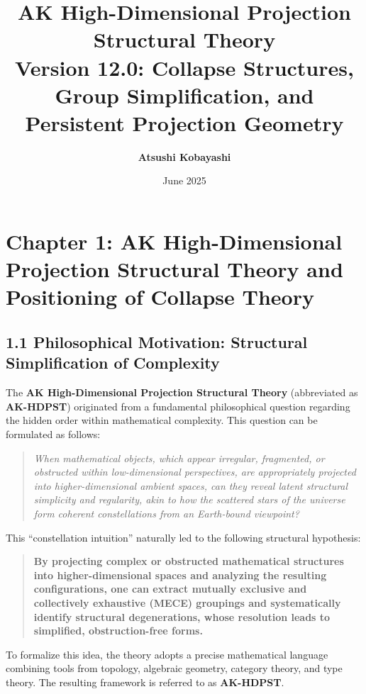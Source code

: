 \documentclass[11pt]{article}
\title{AK High-Dimensional Projection Structural Theory\\
\Large Version 12.0: Collapse Structures, Group Simplification, and Persistent Projection Geometry}
\author{\textbf{Atsushi Kobayashi} \quad {\small (with ChatGPT Research Partner)}}
\date{June 2025}
\begin{document}
\maketitle
\tableofcontents
\newpage


\section{Chapter 1: AK High-Dimensional Projection Structural Theory and Positioning of Collapse Theory}

\subsection*{1.1 Philosophical Motivation: Structural Simplification of Complexity}

The \textbf{AK High-Dimensional Projection Structural Theory} (abbreviated as \textbf{AK-HDPST}) originated from a fundamental philosophical question regarding the hidden order within mathematical complexity. This question can be formulated as follows:

\begin{quote}
\textit{
When mathematical objects, which appear irregular, fragmented, or obstructed within low-dimensional perspectives,  
are appropriately projected into higher-dimensional ambient spaces,  
can they reveal latent structural simplicity and regularity, akin to how the scattered stars of the universe form coherent constellations from an Earth-bound viewpoint?  
}
\end{quote}

This ``constellation intuition'' naturally led to the following structural hypothesis:

\begin{quote}
\textbf{By projecting complex or obstructed mathematical structures into higher-dimensional spaces and analyzing the resulting configurations,  
one can extract mutually exclusive and collectively exhaustive (MECE) groupings and systematically identify structural degenerations,  
whose resolution leads to simplified, obstruction-free forms.}
\end{quote}

To formalize this idea, the theory adopts a precise mathematical language combining tools from topology, algebraic geometry, category theory, and type theory. The resulting framework is referred to as \textbf{AK-HDPST}.
\end{document}
